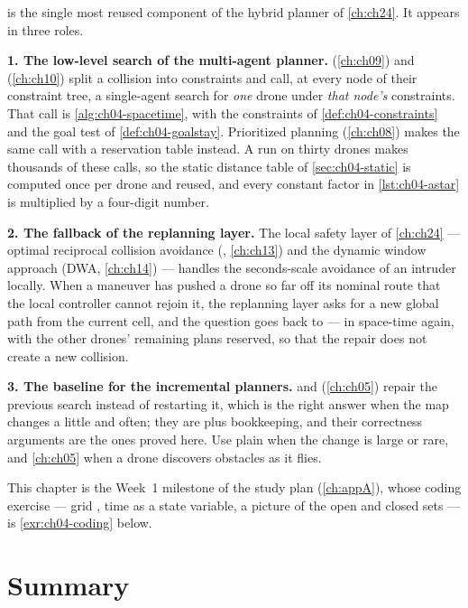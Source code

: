 \begin{dronebox}
\astar is the single most reused component of the hybrid planner of
\cref{ch:ch24}. It appears in three roles.

\textbf{1. The low-level search of the multi-agent planner.} \cbs
(\cref{ch:ch09}) and \ecbs (\cref{ch:ch10}) split a collision into constraints
and call, at every node of their constraint tree, a single-agent search for
\emph{one} drone under \emph{that node's} constraints. That call is
\cref{alg:ch04-spacetime}, with the constraints of
\cref{def:ch04-constraints} and the goal test of \cref{def:ch04-goalstay}.
Prioritized planning (\cref{ch:ch08}) makes the same call with a reservation
table instead. A run on thirty drones makes thousands of these calls, so the
static distance table of \cref{sec:ch04-static} is computed once per drone and
reused, and every constant factor in \cref{lst:ch04-astar} is multiplied by a
four-digit number.

\textbf{2. The fallback of the replanning layer.} The local safety layer of
\cref{ch:ch24} --- optimal reciprocal collision avoidance (\orca,
\cref{ch:ch13}) and the dynamic window approach (DWA, \cref{ch:ch14}) --- handles the
seconds-scale avoidance of an intruder locally. When a maneuver has pushed a
drone so far off its nominal route that the local controller cannot rejoin it,
the replanning layer asks for a new global path from the current cell, and the
question goes back to \astar --- in space-time again, with the other drones'
remaining plans reserved, so that the repair does not create a new collision.

\textbf{3. The baseline for the incremental planners.} \lpastar and \dstarlite
(\cref{ch:ch05}) repair the previous search instead of restarting it, which is
the right answer when the map changes a little and often; they are \astar plus
bookkeeping, and their correctness arguments are the ones proved here. Use
plain \astar when the change is large or rare, and \cref{ch:ch05} when a drone
discovers obstacles as it flies.

This chapter is the Week~1 milestone of the study plan (\cref{ch:appA}), whose
coding exercise --- grid \astar, time as a state variable, a picture of the open
and closed sets --- is \cref{exr:ch04-coding} below.
\end{dronebox}

\section{Summary}
\label{sec:ch04-summary}

